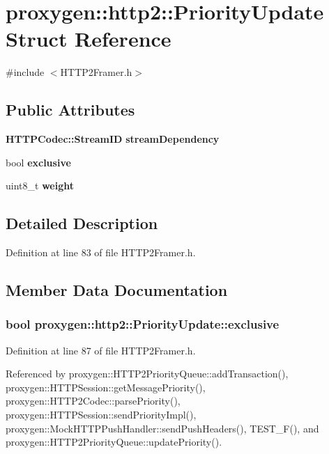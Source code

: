 \section{proxygen\+:\+:http2\+:\+:Priority\+Update Struct Reference}
\label{structproxygen_1_1http2_1_1PriorityUpdate}


{\ttfamily \#include $<$H\+T\+T\+P2\+Framer.\+h$>$}

\subsection*{Public Attributes}
\begin{DoxyCompactItemize}
\item 
{\bf H\+T\+T\+P\+Codec\+::\+Stream\+ID} {\bf stream\+Dependency}
\item 
bool {\bf exclusive}
\item 
uint8\+\_\+t {\bf weight}
\end{DoxyCompactItemize}


\subsection{Detailed Description}


Definition at line 83 of file H\+T\+T\+P2\+Framer.\+h.



\subsection{Member Data Documentation}
\subsubsection[{exclusive}]{\setlength{\rightskip}{0pt plus 5cm}bool proxygen\+::http2\+::\+Priority\+Update\+::exclusive}\label{structproxygen_1_1http2_1_1PriorityUpdate_ab1e1ea2aac877c71cec806cc336a0bbc}


Definition at line 87 of file H\+T\+T\+P2\+Framer.\+h.



Referenced by proxygen\+::\+H\+T\+T\+P2\+Priority\+Queue\+::add\+Transaction(), proxygen\+::\+H\+T\+T\+P\+Session\+::get\+Message\+Priority(), proxygen\+::\+H\+T\+T\+P2\+Codec\+::parse\+Priority(), proxygen\+::\+H\+T\+T\+P\+Session\+::send\+Priority\+Impl(), proxygen\+::\+Mock\+H\+T\+T\+P\+Push\+Handler\+::send\+Push\+Headers(), T\+E\+S\+T\+\_\+\+F(), and proxygen\+::\+H\+T\+T\+P2\+Priority\+Queue\+::update\+Priority().

